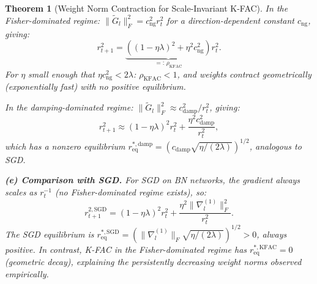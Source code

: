 \documentclass{article}
\providecommand{\norm}[1]{\lVert #1 \rVert}
\theoremstyle{plain}
\newtheorem{theorem}{Theorem}
\theoremstyle{definition}
\theoremstyle{remark}
\begin{document}
\begin{theorem}[Weight Norm Contraction for Scale-Invariant K-FAC]
\emph{In the Fisher-dominated regime}: $\norm{\tilde{G}_l}_F^2 = c_{\mathrm{ng}}^2 r_t^2$ for a direction-dependent constant $c_{\mathrm{ng}}$, giving:
\begin{equation}
\label{eq:geometric_contraction}
    r_{t+1}^2 = \underbrace{((1-\eta\lambda)^2 + \eta^2 c_{\mathrm{ng}}^2)}_{=:\,\rho_{\mathrm{KFAC}}} r_t^2.
\end{equation}
For $\eta$ small enough that $\eta c_{\mathrm{ng}}^2 < 2\lambda$: $\rho_{\mathrm{KFAC}} < 1$, and weights contract \emph{geometrically} (exponentially fast) with no positive equilibrium.

\emph{In the damping-dominated regime}: $\norm{\tilde{G}_l}_F^2 \approx c_{\mathrm{damp}}^2/r_t^2$, giving:
\begin{equation}
    r_{t+1}^2 \approx (1-\eta\lambda)^2 r_t^2 + \frac{\eta^2 c_{\mathrm{damp}}^2}{r_t^2},
\end{equation}
which has a \emph{nonzero} equilibrium $r_{\mathrm{eq}}^{*,\mathrm{damp}} = (c_{\mathrm{damp}}\sqrt{\eta/(2\lambda)})^{1/2}$, analogous to SGD.

\textbf{(e) Comparison with SGD.} For SGD on BN networks, the gradient always scales as $r_t^{-1}$ (no Fisher-dominated regime exists), so:
\begin{equation}
    r_{t+1}^{2,\mathrm{SGD}} = (1-\eta\lambda)^2 r_t^2 + \frac{\eta^2\norm{\nabla_l^{(1)}}_F^2}{r_t^2}.
\end{equation}
The SGD equilibrium is $r_{\mathrm{eq}}^{*,\mathrm{SGD}} = (\norm{\nabla_l^{(1)}}_F \sqrt{\eta/(2\lambda)})^{1/2} > 0$, \emph{always positive}. In contrast, K-FAC in the Fisher-dominated regime has $r_{\mathrm{eq}}^{*,\mathrm{KFAC}} = 0$ (geometric decay), explaining the persistently decreasing weight norms observed empirically.
\end{theorem}
\end{document}
